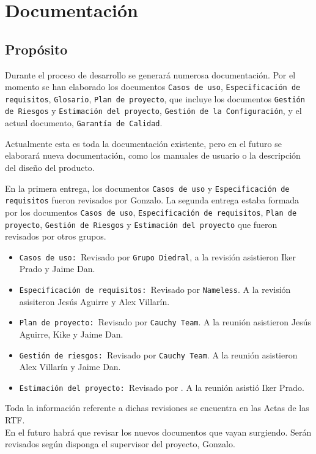 \documentclass[spanish,a4paper,11pt, twoside]{report}	%
\begin{document}
	

\newpage
\mbox{}
\thispagestyle{empty}						%
\newpage

\chapter{ Documentación}%
	
	
	\section{Propósito}
			Durante el proceso de desarrollo se generará numerosa documentación.
		Por el momento se han elaborado los documentos \texttt{Casos de uso}, \texttt{Especificación de requisitos}, \texttt{Glosario}, \texttt{Plan de proyecto}, 
		que incluye los documentos \texttt{Gestión de Riesgos} y \texttt{Estimación del proyecto}, \texttt{Gestión de la Configuración}, 
		y el actual documento, \texttt{Garantía de Calidad}.

		Actualmente esta es toda la documentación existente, pero en el futuro se elaborará nueva documentación, 
		como los manuales de usuario o la descripción del diseño del producto.

			En la primera entrega, los documentos \texttt{Casos de uso} y \texttt{Especificación de requisitos} fueron revisados por Gonzalo. 
		La segunda entrega estaba formada por los documentos \texttt{Casos de uso}, \texttt{Especificación de requisitos}, \texttt{Plan de proyecto}, 
		\texttt{Gestión de Riesgos} y \texttt{Estimación del proyecto} que fueron revisados por otros grupos.
		 \begin{itemize}
		   \item \texttt{Casos de uso: }Revisado por \texttt{Grupo Diedral}, a la revisión asistieron Iker Prado y Jaime Dan.
		   \item \texttt{Especificación de requisitos: }Revisado por \texttt{Nameless}. A la revisión asisiteron Jesús Aguirre y Alex Villarín.
		   \item \texttt{Plan de proyecto: }Revisado por \texttt{Cauchy Team}. A la reunión asistieron Jesús Aguirre, Kike y Jaime Dan.
		   \item \texttt{Gestión de riesgos: }Revisado por \texttt{Cauchy Team}. A la reunión asistieron Alex Villarín y Jaime Dan.
		   \item \texttt{Estimación del proyecto: }Revisado por \texttt{}. A la reunión asistió Iker Prado.%
		 \end{itemize}
		 Toda la información referente a dichas revisiones se encuentra en las Actas de las RTF.\\
		 En el futuro habrá que revisar los nuevos documentos que vayan surgiendo. Serán revisados según disponga el supervisor del proyecto, Gonzalo.
		 
\end{document}
